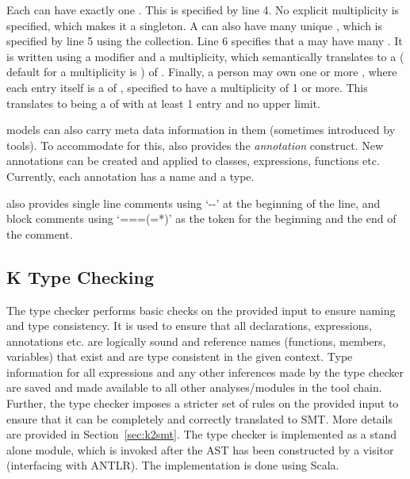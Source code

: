Each  can have exactly one . This is
specified by line 4. No explicit multiplicity is specified, which
makes it a singleton.  A  can also have many unique
, which is specified by line 5 using the 
collection. Line 6 specifies that a  may have many
. It is written using a modifier and a multiplicity, which
semantically translates to a  (\Klang{} default for a
multiplicity is ) of . Finally, a person may own
one or more , where each entry itself is a 
of , specified to have a multiplicity of 1 or more. This
translates to  being a  of 
with at least 1 entry and no upper limit.

\sysml{} models can also carry meta data information in them
(sometimes introduced by tools). To accommodate for this, \Klang{}
also provides the {\em annotation} construct. New annotations can be
created and applied to classes, expressions, functions etc. Currently,
each annotation has a name and a type.

\Klang{} also provides single line comments using `-{}-' at the
beginning of the line, and block comments using `===(=*)' as the token for
the beginning and the end of the comment.

\subsection{K Type Checking}

The \Klang{} type checker performs basic checks on the provided input
to ensure naming and type consistency. It is used to ensure that all
declarations, expressions, annotations etc. are logically sound and
reference names (functions, members, variables) that exist and are
type consistent in the given context. Type information for all
expressions and any other inferences made by the type checker are
saved and made available to all other analyses/modules in the \Klang{}
tool chain. Further, the type checker imposes a stricter set of rules
on the provided input to ensure that it can be completely and
correctly translated to SMT. More details are provided in
Section~\ref{sec:k2smt}. The type checker is implemented as a stand
alone module, which is invoked after the AST has been constructed by a
visitor (interfacing with ANTLR). The implementation is done using
Scala.

